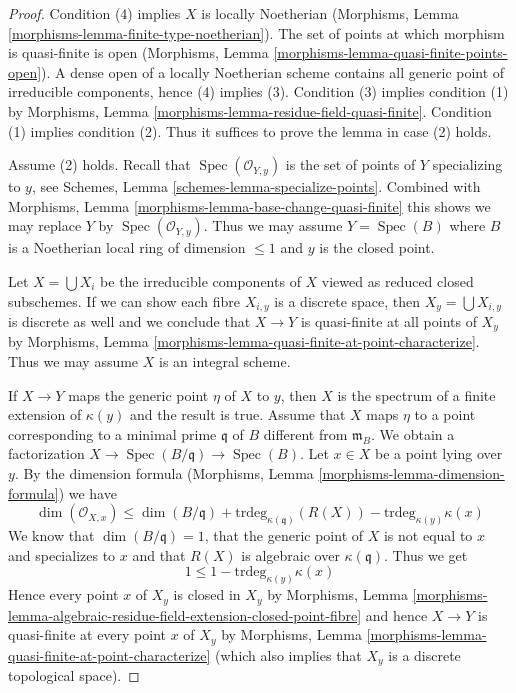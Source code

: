 \documentclass[10pt,a4paper]{amsart}
\theoremstyle{plain}
\theoremstyle{definition}
\theoremstyle{remark}
\numberwithin{equation}{subsection}
\def\Spec{\mathop{\mathrm{Spec}}}
\begin{document}
\begin{proof}
Condition (4) implies $X$ is locally Noetherian
(Morphisms, Lemma \ref{morphisms-lemma-finite-type-noetherian}).
The set of points at which morphism is quasi-finite is open
(Morphisms, Lemma \ref{morphisms-lemma-quasi-finite-points-open}).
A dense open of a locally Noetherian scheme contains all generic
point of irreducible components, hence (4) implies (3).
Condition (3) implies condition
(1) by Morphisms, Lemma \ref{morphisms-lemma-residue-field-quasi-finite}.
Condition (1) implies condition (2).
Thus it suffices to prove the lemma in case (2) holds.

\medskip\noindent
Assume (2) holds. Recall that $\Spec(\mathcal{O}_{Y, y})$
is the set of points of $Y$ specializing to $y$, see
Schemes, Lemma \ref{schemes-lemma-specialize-points}.
Combined with
Morphisms, Lemma \ref{morphisms-lemma-base-change-quasi-finite}
this shows we may replace $Y$ by $\Spec(\mathcal{O}_{Y, y})$.
Thus we may assume $Y = \Spec(B)$ where $B$ is a Noetherian
local ring of dimension $\leq 1$ and $y$ is the closed point.

\medskip\noindent
Let $X = \bigcup X_i$ be the irreducible components of $X$ viewed
as reduced closed subschemes. If we can show each fibre $X_{i, y}$
is a discrete space, then $X_y = \bigcup X_{i, y}$ is discrete as
well and we conclude that $X \to Y$ is quasi-finite at all points
of $X_y$ by Morphisms, Lemma
\ref{morphisms-lemma-quasi-finite-at-point-characterize}.
Thus we may assume $X$ is an integral scheme.

\medskip\noindent
If $X \to Y$ maps the generic point $\eta$ of $X$ to $y$, then $X$
is the spectrum of a finite extension of $\kappa(y)$ and the
result is true. Assume that $X$ maps $\eta$ to a point corresponding
to a minimal prime $\mathfrak q$ of $B$ different from $\mathfrak m_B$.
We obtain a factorization $X \to \Spec(B/\mathfrak q) \to \Spec(B)$.
Let $x \in X$ be a point lying over $y$.
By the dimension formula
(Morphisms, Lemma \ref{morphisms-lemma-dimension-formula})
we have
$$
\dim(\mathcal{O}_{X, x}) \leq \dim(B/\mathfrak q) +
\text{trdeg}_{\kappa(\mathfrak q)}(R(X)) - \text{trdeg}_{\kappa(y)} \kappa(x)
$$
We know that $\dim(B/\mathfrak q) = 1$, that the generic point of $X$
is not equal to $x$ and specializes to $x$ and that $R(X)$ is algebraic
over $\kappa(\mathfrak q)$. Thus we get
$$
1 \leq 1 - \text{trdeg}_{\kappa(y)} \kappa(x)
$$
Hence every point $x$ of $X_y$ is closed in $X_y$ by
Morphisms, Lemma
\ref{morphisms-lemma-algebraic-residue-field-extension-closed-point-fibre}
and hence $X \to Y$ is quasi-finite at every point $x$ of $X_y$ by
Morphisms, Lemma \ref{morphisms-lemma-quasi-finite-at-point-characterize}
(which also implies that $X_y$ is a discrete topological space).
\end{proof}
\end{document}
